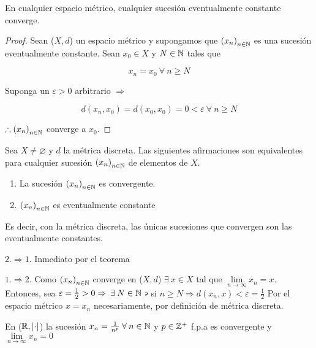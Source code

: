 \begin{theorem} \label{theom2211}
    En cualquier espacio métrico, cualquier sucesión eventualmente constante converge.
\end{theorem}

\begin{proof}
    Sean ($X,d$) un espacio métrico y supongamos que ${(x_n)}_{n \in \mathbb{N}}$ es una sucesión eventualmente constante. Sean $x_0 \in X$ y $N \in \mathbb{N}$ tales que 
    
    $$x_n=x_0 \: \forall \: n \geqslant N$$

    Suponga un $\varepsilon > 0$ arbitrario $\Rightarrow$

    $$d(x_n,x_0) = d(x_0,x_0) = 0 < \varepsilon \: \forall \: n \geqslant N$$

    $\therefore {(x_n)}_{n \in \mathbb{N}}$ converge a $x_0$.
\end{proof}

\begin{eg}
    Sea $X \neq \varnothing$ y $d$ la métrica discreta. Las siguientes afirmaciones son equivalentes para cualquier sucesión ${(x_n)}_{n \in \mathbb{N}}$ de elementos de $X$.

    \begin{enumerate}
        \item La sucesión ${(x_n)}_{n \in \mathbb{N}}$ es convergente.
        \item ${(x_n)}_{n \in \mathbb{N}}$ es eventualmente constante
    \end{enumerate}

    Es decir, con la métrica discreta, las únicas sucesiones que convergen son las eventualmente constantes.
\end{eg}

\begin{proofexplanation}
    $2. \Rightarrow 1.$ Inmediato por el teorema 

    $1. \Rightarrow 2.$ Como ${(x_n)}_{n \in \mathbb{N}}$ converge en ($X,d$) $\exists \: x \in X$ tal que $\lim\limits_{n \to \infty} x_n = x$. Entonces, sea $\varepsilon = \frac{1}{2} > 0 \Rightarrow \: \exists \: N \in \mathbb{N} \backepsilon$ si $n \geqslant N \Rightarrow d(x_n,x) < \varepsilon = \frac{1}{2}$ Por el espacio métrico $x=x_n$ necesariamente, por definición de métrica discreta. 
\end{proofexplanation}

\begin{eg}
    En ($\mathbb{R},\abs{\cdot}$) la sucesión $x_n = \frac{1}{n^p} \: \forall \: n \in \mathbb{N}$ y $p \in \mathbb{Z}^+$ f.p.a es convergente y $\lim\limits_{n \to \infty} x_n = 0$ 
\end{eg}

